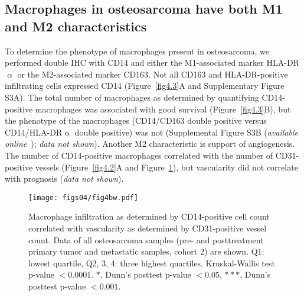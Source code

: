 \subsection{Macrophages in osteosarcoma have both M1 and M2
characteristics}
To determine the phenotype of macrophages present in
osteosarcoma, we performed double IHC with CD14 and
either the M1\hyp{}associated marker HLA-DR$\upalpha$ or the M2\hyp{}associated
marker CD163. Not all CD163 and HLA-DR\hyp{}positive
infiltrating cells expressed CD14 (Figure~\ref{fig4.3}A and Supplementary
Figure S3A). The total number of macrophages as determined
by quantifying CD14\hyp{}positive macrophages was
associated with good survival (Figure~\ref{fig4.3}B), but the phenotype
of the macrophages (CD14/CD163 double positive versus
CD14/HLA-DR$\upalpha$ double positive) was not (Supplemental
Figure S3B ({\it available online}~\cite{ch4additional}); {\it data not shown}). Another M2 characteristic is
support of angiogenesis. The number of CD14\hyp{}positive
macrophages correlated with the number of CD31\hyp{}positive
vessels (Figure~\ref{fig4.2}A and Figure~\ref{fig4.4}), but vascularity did not correlate
with prognosis ({\it data not shown}).
%
\begin{figure}[htbp]
  \centering
  \begin{minipage}[b]{0.50\linewidth}
    \texttt{[image: figs04/fig4bw.pdf]}	%
  \end{minipage}
    \hfill
  \begin{minipage}[b]{0.46\linewidth}
    \caption{Macrophage infiltration as determined by CD14\hyp{}positive cell count correlated with vascularity as determined by CD31\hyp{}positive vessel count. Data of all osteosarcoma samples (pre- and posttreatment primary tumor and metastatic samples, cohort 2) are shown. Q1: lowest quartile, Q2, 3, 4: three highest quartiles. Kruskal-Wallis test p-value $<0.0001$. $\ast$, Dunn's posttest p-value $<0.05$, $\ast\ast\ast$, Dunn's posttest p-value $<0.001$.}
     \label{fig4.4}
     \end{minipage}
\end{figure}
%

